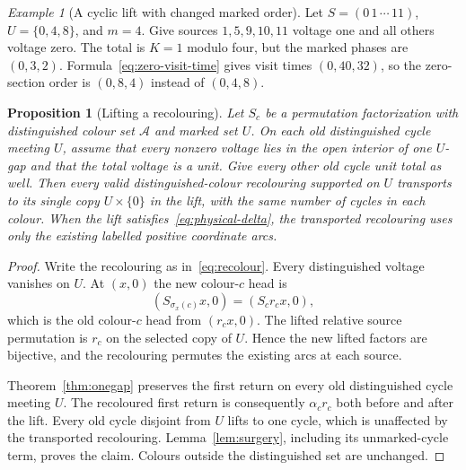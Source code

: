\documentclass[11pt,reqno]{amsart}
\numberwithin{equation}{section}
\newtheorem{proposition}[theorem]{Proposition}
\theoremstyle{definition}
\theoremstyle{remark}
\newtheorem{example}[theorem]{Example}
\newcommand{\cA}{\mathcal A}
\begin{document}
\begin{example}[A cyclic lift with changed marked order]\label{ex:spread}\label{ex:unit-not-order}
Let $S=(0\,1\,\cdots\,11)$,
$U=\{0,4,8\}$, and $m=4$. Give sources $1,5,9,10,11$ voltage one and all
others voltage zero. The total is $K=1$ modulo four, but the marked
phases are $(0,3,2)$. Formula~\eqref{eq:zero-visit-time} gives visit times
$(0,40,32)$, so the zero-section order is $(0,8,4)$ instead of $(0,4,8)$.
\end{example}

\begin{proposition}[Lifting a recolouring]\label{prop:transport}
Let $S_c$ be a permutation factorization with distinguished colour set $\cA$ and marked
set $U$. On each old distinguished cycle meeting $U$, assume that every nonzero
voltage lies in the open interior of one $U$-gap and that the total voltage is a
unit. Give every other old cycle unit total as well. Then every valid
distinguished-colour recolouring supported on $U$ transports to its single copy
$U\times\{0\}$ in the lift, with the same number of cycles in each colour.
When the lift satisfies~\eqref{eq:physical-delta}, the transported recolouring
uses only the existing labelled positive coordinate arcs.
\end{proposition}
\begin{proof}
Write the recolouring as in~\eqref{eq:recolour}. Every distinguished voltage vanishes on
$U$. At $(x,0)$ the new colour-$c$ head is
\[
 (S_{\sigma_x(c)}x,0)=(S_cr_cx,0),
\]
which is the old colour-$c$ head from $(r_cx,0)$. The lifted relative source
permutation is $r_c$ on the selected copy of $U$. Hence the new lifted factors
are bijective, and the recolouring permutes the existing arcs at each source.

Theorem~\ref{thm:onegap} preserves the first return on every old distinguished cycle
meeting $U$. The recoloured first return is consequently $\alpha_cr_c$ both before
and after the lift. Every old cycle disjoint from $U$ lifts to one cycle, which is unaffected by
the transported recolouring. Lemma~\ref{lem:surgery}, including its unmarked-cycle term, proves the
claim. Colours outside the distinguished set are unchanged.
\end{proof}
\end{document}
